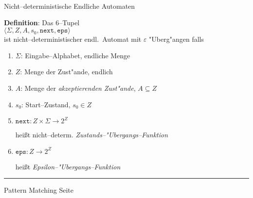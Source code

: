 
\begin{slide}{}
\normalsize

\begin{center}
Nicht--deterministische Endliche Automaten
\end{center}
\vspace*{0.5cm}

\footnotesize
\textbf{Definition}: Das 6--Tupel \\[0.3cm]
\hspace*{1.3cm} $\langle \Sigma, Z, A, s_0, \mathtt{next}, \mathtt{eps}  \rangle$ \\[0.3cm]
ist nicht--deterministischer endl.~Automat mit $\varepsilon$ "Uberg"angen 
falls
\begin{enumerate}
\item $\Sigma$: Eingabe--Alphabet, endliche Menge
\item $Z$: Menge der Zust"ande, endlich
\item $A$: Menge der \emph{akzeptierenden Zust"ande}, $A \subseteq Z$
\item $s_0$: Start--Zustand, $s_0 \in Z$
\item $\mathtt{next}: Z \times \Sigma \rightarrow 2^Z$

      hei{\ss}t nicht--determ. \emph{Zustands--"Ubergangs--Funktion}
\item $\mathtt{eps}: Z  \rightarrow 2^Z$

      hei{\ss}t  \emph{Epsilon--"Ubergangs--Funktion}
\end{enumerate}
\vspace*{-1cm}
\hspace*{-1cm}
\vspace*{\fill}

\tiny \addtocounter{mypage}{1}
\rule{17cm}{1mm}
Pattern Matching \hspace*{\fill} Seite 
\end{slide}


